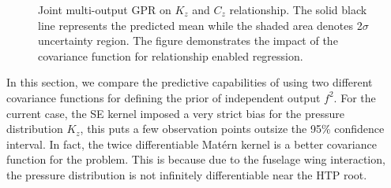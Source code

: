 \begin{figure}[!ht]
  \centering
  \quad
  \quad
\caption{Joint multi-output GPR on  \(K_{z}\) and \(C_{z}\) relationship. The solid black line represents the predicted mean while the shaded area denotes 2\(\sigma\) uncertainty region. The figure demonstrates the impact of the covariance function for relationship enabled regression.}
  \label{fig:cztzRelationship}
\end{figure}

In this section, we compare the predictive capabilities of using two different covariance functions for defining the prior of independent output $f^2$. For the current case, the SE kernel imposed a very strict bias for the pressure distribution $K_z$, this puts a few observation points outsize the 95\% confidence interval. In fact, the twice differentiable Mat\'ern kernel is a better covariance function for the problem. This is because due to the fuselage wing interaction, the pressure distribution is not infinitely differentiable near the HTP root. 

